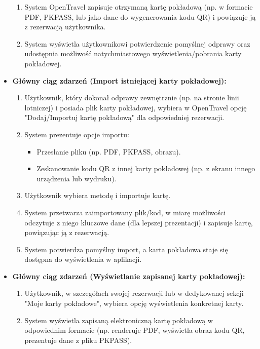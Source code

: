 \documentclass[a4paper,12pt]{article}
\begin{document}
\begin{itemize}
\begin{enumerate}
            \item System OpenTravel zapisuje otrzymaną kartę pokładową (np. w formacie PDF, PKPASS, lub jako dane do wygenerowania kodu QR) i powiązuje ją z rezerwacją użytkownika.
            \item System wyświetla użytkownikowi potwierdzenie pomyślnej odprawy oraz udostępnia możliwość natychmiastowego wyświetlenia/pobrania karty pokładowej.
        \end{enumerate}
    \item \textbf{Główny ciąg zdarzeń (Import istniejącej karty pokładowej):}
        \begin{enumerate}
            \item Użytkownik, który dokonał odprawy zewnętrznie (np. na stronie linii lotniczej) i posiada plik karty pokładowej, wybiera w OpenTravel opcję "Dodaj/Importuj kartę pokładową" dla odpowiedniej rezerwacji.
            \item System prezentuje opcje importu:
                \begin{itemize}
                    \item Przesłanie pliku (np. PDF, PKPASS, obrazu).
                    \item Zeskanowanie kodu QR z innej karty pokładowej (np. z ekranu innego urządzenia lub wydruku).
                \end{itemize}
            \item Użytkownik wybiera metodę i importuje kartę.
            \item System przetwarza zaimportowany plik/kod, w miarę możliwości odczytuje z niego kluczowe dane (dla lepszej prezentacji) i zapisuje kartę, powiązując ją z rezerwacją.
            \item System potwierdza pomyślny import, a karta pokładowa staje się dostępna do wyświetlenia w aplikacji.
        \end{enumerate}
    \item \textbf{Główny ciąg zdarzeń (Wyświetlanie zapisanej karty pokładowej):}
        \begin{enumerate}
            \item Użytkownik, w szczegółach swojej rezerwacji lub w dedykowanej sekcji "Moje karty pokładowe", wybiera opcję wyświetlenia konkretnej karty.
            \item System wyświetla zapisaną elektroniczną kartę pokładową w odpowiednim formacie (np. renderuje PDF, wyświetla obraz kodu QR, prezentuje dane z pliku PKPASS).
        \end{enumerate}

\end{itemize}
\end{document}
